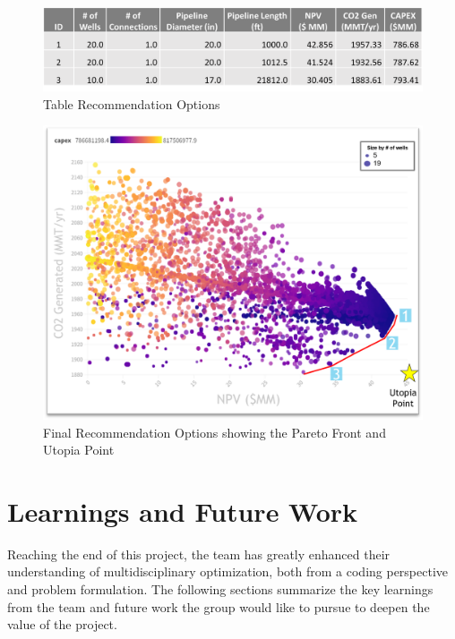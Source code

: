 \documentclass[balance,upint,subscriptcorrection,varvw,mathalfa=cal=boondoxo,spanish,french,vietnamese,russian,greek,pdf-a,colorlinks]{asmeconf}
\begin{document}
\begin{figure}
\centering\includegraphics[width=1\linewidth]{images/Options_Table.png}
\caption{Table Recommendation Options}
\label{Options_Table}
\end{figure}

\begin{figure}
\centering\includegraphics[width=1\linewidth]{images/Final Recommendation.png}
\caption{Final Recommendation Options showing the Pareto Front and Utopia Point}
\label{Final Recommendation}
\end{figure}

\section{Learnings and Future Work}
Reaching the end of this project, the team has greatly enhanced their understanding of multidisciplinary optimization, both from a coding perspective and problem formulation. The following sections summarize the key learnings from the team and future work the group would like to pursue to deepen the value of the project.
\end{document}
